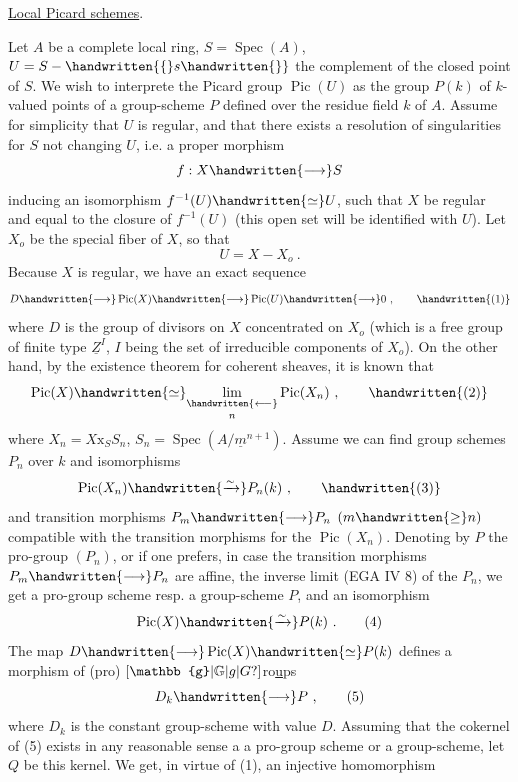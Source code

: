 \uline{Local Picard schemes}.

Let $A$ be a complete local ring,  $S=\operatorname{Spec}(A)$, $U=S-\handwritten{\{}s\handwritten{\}}$ the complement of the closed point of $S$. We wish to interprete the Picard  group $\operatorname{Pic}(U)$ as  the group $P(k)$ of $k$-valued points of a group-scheme $P$ defined over the residue field $k$ of $A$. Assume for simplicity that $U$ is regular, and that there exists a resolution of singularities for $S$ not changing $U$, i.e. a proper morphism
\[
f:X\handwritten{\longrightarrow}S
\]
inducing an isomorphism $f^{-1}(U)\handwritten{\simeq}U$, such that $X$ be regular and equal to the closure of $f^{-1}(U)$ (this open set will be identified with $U$). Let $X_o$ be the special fiber of $X$, so that
\[
U=X-X_o\ .
\]
Because $X$ is regular, we have an exact sequence
\[
D\handwritten{\longrightarrow}\operatorname{Pic}(X)\handwritten{\longrightarrow}\operatorname{Pic}(U)\handwritten{\longrightarrow}0\ ,
\tag*{\handwritten{(1)}}
\]
where $D$ is the group of divisors on $X$ concentrated on $X_o$ (which is a free group of finite type $\underline{Z}^{I}$, $I$ being the set of irreducible components of $X_o$). On the other hand, by the existence theorem for coherent sheaves, it is known that
\[
\operatorname{Pic}(X)\handwritten{\simeq}\underset{n}{\underset{\handwritten{\longleftarrow}}{\lim}}\operatorname{Pic}(X_n)\ ,
\tag*{\handwritten{(2)}}
\]
where $X_n=X\mathrm{x}_S S_n$, $S_n=\operatorname{Spec}(A/\underline{m}^{n+1})$. Assume we can find group schemes $P_n$ over $k$ and isomorphisms
\[
\operatorname{Pic}(X_n)\handwritten{\xrightarrow{\sim}}P_n(k)\ ,
\tag*{\handwritten{(3)}}
\]
and transition morphisms $P_m\handwritten{\longrightarrow}P_n$ $(m\handwritten{\geq}n)$ compatible with the transition morphisms for the $\operatorname{Pic}(X_n)$. Denoting by $P$ the pro-group $(P_n)$, or if one prefers, in case the transition morphisms $P_m\handwritten{\longrightarrow}P_n$ are affine, the inverse limit (EGA IV 8) of the $P_n$, we get a pro-group scheme resp. a group-scheme $P$, and an isomorphism
\[
\operatorname{Pic}(X)\handwritten{\xrightarrow{\sim}}P(k)\ .
\tag*{(4)}
\]
The map $D\handwritten{\longrightarrow}\operatorname{Pic}(X)\handwritten{\simeq}P(k)$ defines a morphism of (pro) $\unsure{\mathbb{g}|\mathbb{G}|g|G}$ro\uline{u}ps
\[
D_k\handwritten{\longrightarrow}P\ ,
\tag*{(5)}
\]
where $D_k$ is the constant group-scheme with value $D$. Assuming that the cokernel of (5) exists in any reasonable sense a a pro-group scheme or a group-scheme, let $Q$ be this kernel. We get, in virtue of (1), an injective homomorphism
